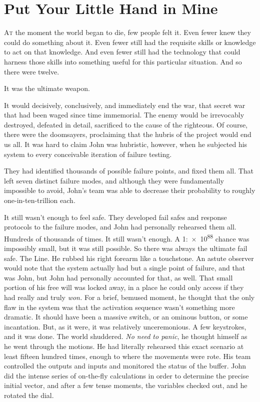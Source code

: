 \chapter{Put Your Little Hand in Mine}


\lettrine{A}{t} the moment the world began to die, few people felt it.
\SmallVSpace
Even fewer knew they could do something about it.
\SmallVSpace
Even fewer still had the requisite skills or knowledge to act on that knowledge.
\SmallVSpace
And even fewer still had the technology that could harness those skills into something useful for this particular situation.
\SomeVSpace
And so{\el} there were twelve.
\simpleline
{}

It was the ultimate weapon.

It would decisively, conclusively, and immediately end the war, that secret war that had been waged since time immemorial. The enemy would be irrevocably destroyed, defeated in detail, sacrificed to the cause of the righteous. Of course, there were the doomsayers, proclaiming that the hubris of the project would end us all. It was hard to claim John was hubristic, however, when he subjected his system to every conceivable iteration of failure testing.

They had identified thousands of possible failure points, and fixed them all. That left seven distinct failure modes, and although they were fundamentally impossible to avoid, John’s team was able to decrease their probability to roughly one-in-ten-trillion each.

It still wasn’t enough to feel safe. They developed fail safes and response protocols to the failure modes, and John had personally rehearsed them all. Hundreds of thousands of times.
\SomeVSpace
It still wasn’t enough.
\SomeVSpace
A 1:\num{e88} chance was impossibly small, but it was still possible. So there was always the ultimate fail safe. The Line. He rubbed his right forearm like a touchstone. An astute observer would note that the system actually had but a single point of failure, and that was John, but John had personally accounted for that, as well. That small portion of his free will was locked away, in a place he could only access if they had really and truly \emph{won.}
\SmallVSpace
For a brief, bemused moment, he thought that the only flaw in the system was that the activation sequence wasn’t something more dramatic. It should have been a massive switch, or an ominous button, or some incantation. But, as it were, it was relatively unceremonious. A few keystrokes, and it was done.
\SomeVSpace
\simpleline
The world shuddered.
\simpleline
\emph{No need to panic}, he thought himself as he went through the motions. He had literally rehearsed this exact scenario at least fifteen hundred times, enough to where the movements were rote. His team controlled the outputs and inputs and monitored the status of the buffer. John did the intense series of on-the-fly calculations in order to determine the precise initial vector, and after a few tense moments, the variables checked out, and he rotated the dial.

